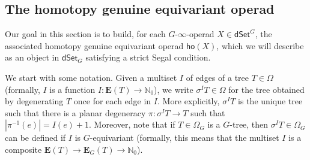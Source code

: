\documentclass[a4paper,10pt
,draft
]{article}%
\renewcommand{\1}{\eta}%
\begin{document}
\subsection{The homotopy genuine equivariant operad}


Our goal in this section is to build,
for each $G$-$\infty$-operad $X \in \mathsf{dSet}^G$,
the associated homotopy genuine equivariant operad
$\mathsf{ho} (X)$,
which we will describe as an object in
$\mathsf{dSet}_G$
satisfying a strict Segal condition.


We start with some notation. 
Given a multiset $I$ of edges of a tree $T \in \Omega$
(formally, $I$ is a function 
$I \colon \boldsymbol{E}(T) \to \mathbb{N}_0$),
we write $\sigma^I T \in \Omega$
for the tree obtained by degenerating $T$ once for each edge in $I$.
More explicitly, $\sigma^I T$ is the unique tree such that there is a planar degeneracy
$\pi \colon \sigma^I T \to T$
such that $|\pi^{-1}(e)| = I(e) + 1$.
Moreover,
note that if $T\in \Omega_G$ is a $G$-tree, 
then $\sigma^{I} T \in \Omega_{G}$
can be defined if $I$ is $G$-equivariant
(formally, this means that the multiset $I$ is a composite
$\boldsymbol{E}(T) \to \boldsymbol{E}_G(T)
\to \mathbb{N}_0$).
\end{document}
